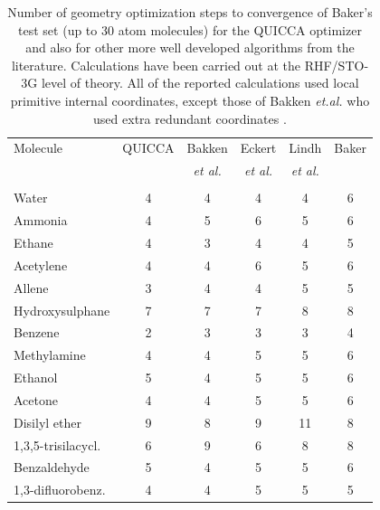 \documentclass[prl,twocolumn,showpacs,twocolumngrid,superbib]{revtex4}
\begin{document}
\begin{table}[h]
\caption{
Number of geometry optimization steps to convergence of Baker's test set
(up to 30 atom molecules) for the QUICCA optimizer and also for other 
more well developed algorithms from the literature.  Calculations have 
been carried out at the RHF/STO-3G level of theory.  All of the reported
calculations used local primitive internal coordinates, except those
of Bakken {\it et.al.} who used extra redundant coordinates \cite{bakken}.
}
\label{Bakers_test}
\begin{tabular}{lccccc}
\toprule
Molecule               & QUICCA  & Bakken         & Eckert         & Lindh         &  Baker  \\
                       &         & {\it{et al.}}  & {\it{et al.}}  & {\it{et al.}} &    \\
                       &         &  \cite{bakken} &  \cite{eckert} & \cite{lindh}  &  \cite{bakerstest} \\
\colrule
Water                  &   4    &   4    &    4    &    4   &   6     \\
Ammonia                &   4    &   5    &    6    &    5   &   6     \\
Ethane                 &   4    &   3    &    4    &    4   &   5     \\
Acetylene              &   4    &   4    &    6    &    5   &   6     \\
Allene                 &   3    &   4    &    4    &    5   &   5     \\
Hydroxysulphane        &   7    &   7    &    7    &    8   &   8     \\
Benzene                &   2    &   3    &    3    &    3   &   4     \\
Methylamine            &   4    &   4    &    5    &    5   &   6     \\
Ethanol                &   5    &   4    &    5    &    5   &   6     \\
Acetone                &   4    &   4    &    5    &    5   &   6     \\
Disilyl ether          &   9    &   8    &    9    &   11   &   8     \\
1,3,5-trisilacycl.     &   6    &   9    &    6    &    8   &   8     \\
Benzaldehyde           &   5    &   4    &    5    &    5   &   6     \\
1,3-difluorobenz.      &   4    &   4    &    5    &    5   &   5     \\

\end{tabular}
\end{table}
\end{document}
